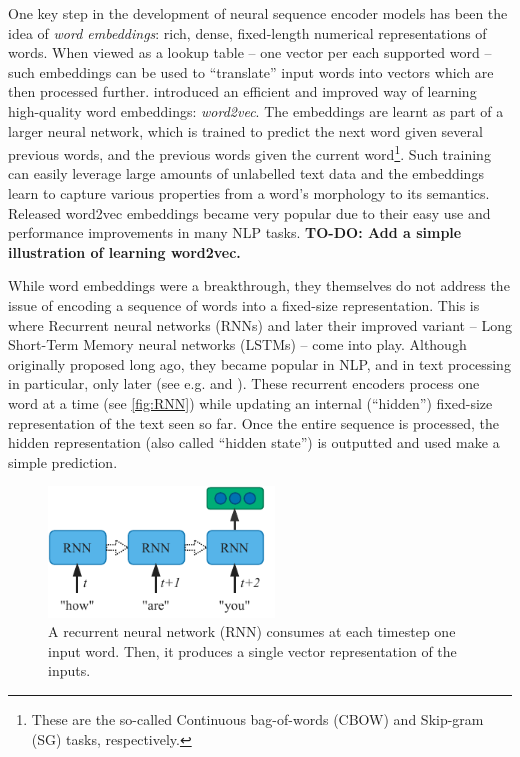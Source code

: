 \documentclass[bsc,frontabs,twoside,singlespacing,parskip,deptreport]{infthesis}
\begin{document}
{{    One key step in the development of neural sequence encoder models has been the idea of \textit{word embeddings}: rich, dense, fixed-length numerical representations of words. When viewed as a lookup table -- one vector per each supported word -- such embeddings can be used to ``translate'' input words into vectors which are then processed further.
    \citet{Mikolov_2013} introduced an efficient and improved way of learning high-quality word embeddings: \textit{word2vec}. The embeddings are learnt as part of a larger neural network, which is trained to predict the next word given several previous words, and the previous words given the current word\footnote{These are the so-called Continuous bag-of-words (CBOW) and Skip-gram (SG) tasks, respectively.}. Such training can easily leverage large amounts of unlabelled text data and the embeddings learn to capture various properties from a word's morphology to its semantics. Released word2vec embeddings became very popular due to their easy use and performance improvements in many NLP tasks.
    \textbf{TO-DO: Add a simple illustration of learning word2vec.}

    
    While word embeddings were a breakthrough, they themselves do not address the issue of encoding a sequence of words into a fixed-size representation. This is where Recurrent neural networks (RNNs) \citep{Rumelhart_1986} and later their improved variant -- Long Short-Term Memory neural networks (LSTMs) \citep{Hochreiter_Schmidhuber_1997} -- come into play. Although originally proposed long ago, they became popular in NLP, and in text processing in particular, only later (see e.g. \citet{Mikolov_2010} and \citet{Graves_2013}). These recurrent encoders process one word at a time (see \autoref{fig:RNN}) while updating an internal (``hidden'') fixed-size representation of the text seen so far. Once the entire sequence is processed, the hidden representation (also called ``hidden state'') is outputted and used make a simple prediction.
    \begin{figure}[h!t]
      \centering
      \includegraphics[width=6cm]{graphics/rnn}
      \caption{A recurrent neural network (RNN) consumes at each timestep one input word. Then, it produces a single vector representation of the inputs.}
      \label{fig:RNN}
    \end{figure}

}}
\end{document}
